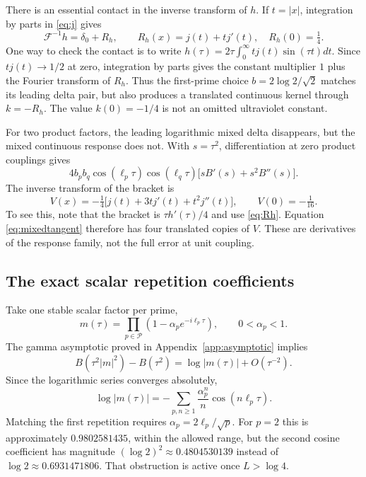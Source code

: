 \documentclass[11pt]{article}
\numberwithin{equation}{section}
\theoremstyle{definition}
\theoremstyle{remark}
\begin{document}
There is an essential contact in the inverse transform of $h$. If $t=|x|$, integration by parts in \eqref{eq:j} gives
\begin{equation}
 \mathcal F^{-1}h=\delta_0+R_h,
 \qquad R_h(x)=j(t)+tj'(t),\quad R_h(0)=\tfrac14.
 \label{eq:Rh}
\end{equation}
One way to check the contact is to write $h(\tau)=2\tau\int_0^\infty tj(t)\sin(\tau t)dt$. Since $tj(t)\to1/2$ at zero, integration by parts gives the constant multiplier $1$ plus the Fourier transform of $R_h$. Thus the first-prime choice $b=2\log2/\sqrt2$ matches its leading delta pair, but also produces a translated continuous kernel through $k=-R_h$. The value $k(0)=-1/4$ is not an omitted ultraviolet constant.

For two product factors, the leading logarithmic mixed delta disappears, but the mixed continuous response does not. With $s=\tau^2$, differentiation at zero product couplings gives
\begin{equation}
 4b_pb_q\cos(\ell_p\tau)\cos(\ell_q\tau)
 \bigl[sB'(s)+s^2B''(s)\bigr].
 \label{eq:mixedtangent}
\end{equation}
The inverse transform of the bracket is
\begin{equation}
 V(x)=-\tfrac14\bigl[j(t)+3tj'(t)+t^2j''(t)\bigr],
 \qquad V(0)=-\tfrac1{16}.
\end{equation}
To see this, note that the bracket is $\tau h'(\tau)/4$ and use \eqref{eq:Rh}. Equation \eqref{eq:mixedtangent} therefore has four translated copies of $V$. These are derivatives of the response family, not the full error at unit coupling.

\subsection{The exact scalar repetition coefficients}
Take one stable scalar factor per prime,
\begin{equation}
 m(\tau)=\prod_{p\in\mathcal P}(1-\alpha_pe^{-i\ell_p\tau}),
 \qquad0<\alpha_p<1.
\end{equation}
The gamma asymptotic proved in Appendix~\ref{app:asymptotic} implies
\begin{equation}
 B(\tau^2|m|^2)-B(\tau^2)=\log|m(\tau)|+O(\tau^{-2}).
\end{equation}
Since the logarithmic series converges absolutely,
\begin{equation}
 \log|m(\tau)|=-\sum_{p,n\ge1}\frac{\alpha_p^n}{n}
 \cos(n\ell_p\tau).
 \label{eq:scalarcoeff}
\end{equation}
Matching the first repetition requires $\alpha_p=2\ell_p/\sqrt p$. For $p=2$ this is approximately $0.9802581435$, within the allowed range, but the second cosine coefficient has magnitude $(\log2)^2\approx0.4804530139$ instead of $\log2\approx0.6931471806$. That obstruction is active once $L>\log4$.
\end{document}
